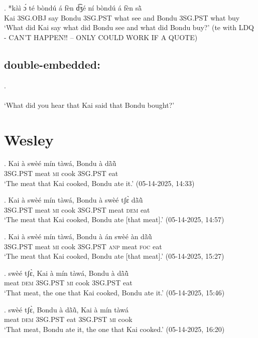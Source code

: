 \documentclass{assets/fieldnotes}
\begin{document}
\exg. *kàì ɔ́ té bòndú á fèn d͡ʒé ní bòndú á fèn sã̀\\
Kai 3SG.OBJ say Bondu 3SG.PST what see and Bondu 3SG.PST what buy\\
`What did Kai say what did Bondu see and what did Bondu buy?' (te with LDQ - CAN'T HAPPEN!! -- ONLY COULD WORK IF A QUOTE)

\subsection{double-embedded:}

\exg. \\
\\
`What did you hear that Kai said that Bondu bought?' \\ 

\section{Wesley}

\exg. Kai à swèé mín tàwá, Bondu à dã̀ũ̀\\
{} \textsc{3SG.PST} meat \textsc{mi} cook {} \textsc{3SG.PST} eat\\
`The meat that Kai cooked, Bondu ate it.’ \hfill{(05-14-2025, 14:33)}

\exg. Kai à swèé mín tàwá, Bondu à swèé tʃɛ̀ dã̀ũ̀\\
{} \textsc{3SG.PST} meat \textsc{mi} cook {} \textsc{3SG.PST} meat \textsc{dem} eat\\
`The meat that Kai cooked, Bondu ate [that meat].’ \hfill{(05-14-2025, 14:57)}

\exg. Kai à swèé mín tàwá, Bondu à án swèé àn dã̀ũ̀\\
{} \textsc{3SG.PST} meat \textsc{mi} cook {}  \textsc{3SG.PST} \textsc{anp} meat \textsc{foc} eat\\
`The meat that Kai cooked, Bondu ate [that meat].’ \hfill{(05-14-2025, 15:27)}

\exg. swèé tʃɛ̀, Kai à mín tàwá, Bondu à dã̀ũ̀\\
meat \textsc{dem} {} \textsc{3SG.PST} \textsc{mi} cook {} \textsc{3SG.PST} eat\\
`That meat, the one that Kai cooked, Bondu ate it.’ \hfill{(05-14-2025, 15:46)}

\exg. swèé tʃɛ̀, Bondu à dã̀ũ̀, Kai à mín tàwá \\
meat \textsc{dem} {} \textsc{3SG.PST} eat {} \textsc{3SG.PST} \textsc{mi} cook \\
`That meat, Bondu ate it, the one that Kai cooked.’ \hfill{(05-14-2025, 16:20)}
\end{document}
